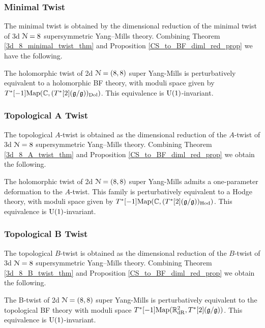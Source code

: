 \documentclass[10pt, oneside]{article}
\begin{document}
\subsubsection{Minimal Twist} \label{sect:2d88minimaltwist}
The minimal twist is obtained by the dimensional reduction of the minimal twist of 3d $\mathcal{N}=8$ supersymmetric Yang--Mills theory.
Combining Theorem \ref{3d_8_minimal_twist_thm} and Proposition \ref{CS_to_BF_diml_red_prop} we have the following.

\begin{theorem}
The holomorphic twist of 2d $\mathcal{N}=(8,8)$ super Yang-Mills is perturbatively equivalent to a holomorphic BF theory, with moduli space given by $T^*[-1]\mathrm{Map}(\mathbb C, (T^*[2](\mathfrak{g} / \mathfrak{g}))_{\mathrm{Dol}})$. This equivalence is $\mathrm{U}(1)$-invariant.
\end{theorem}

\subsubsection{Topological A Twist} \label{sect:2d88Atwist}
The topological $A$-twist is obtained as the dimensional reduction of the $A$-twist of 3d $\mathcal N = 8$ supersymmetric Yang--Mills theory.
Combining Theorem \ref{3d_8_A_twist_thm} and Proposition \ref{CS_to_BF_diml_red_prop} we obtain the following.

\begin{theorem}
The holomorphic twist of 2d $\mathcal{N}=(8,8)$ super Yang-Mills admits a one-parameter deformation to the $A$-twist.  This family is perturbatively equivalent to a Hodge theory, with moduli space given by $T^*[-1]\mathrm{Map}(\mathbb C, (T^*[2](\mathfrak{g} / \mathfrak{g}))_{\mathrm{Hod}})$.   This equivalence is $\mathrm{U}(1)$-invariant.
\end{theorem}

\subsubsection{Topological B Twist} \label{sect:2d88Btwist}
The topological $B$-twist is obtained as the dimensional reduction of the $B$-twist of 3d $\mathcal N = 8$ supersymmetric Yang--Mills theory.
Combining Theorem \ref{3d_8_B_twist_thm} and Proposition \ref{CS_to_BF_diml_red_prop} we obtain the following.

\begin{theorem}
The B-twist of 2d $\mathcal{N}=(8,8)$ super Yang-Mills is perturbatively equivalent to the topological BF theory with moduli space $T^*[-1]\mathrm{Map}(\mathbb R^2_{\mathrm{dR}}, T^*[2](\mathfrak{g} / \mathfrak{g}))$.  This equivalence is $\mathrm{U}(1)$-invariant.
\end{theorem}
\end{document}
